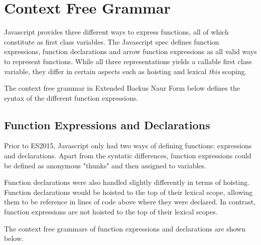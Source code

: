 \section{Context Free Grammar}

Javascript provides three different ways to express functions, all of which constitute as first class variables\parencite{firstClassFunctions}. The Javascript spec\parencite{jsCfg} defines function expressions, function declarations and arrow function expressions as all valid ways to represent functions. While all three representations yields a callable first class variable, they differ in certain aspects such as hoisting\parencite{hoisting} and lexical \textit{this} scoping\parencite{arrowFn}.

The context free grammar in Extended Backus Naur Form\parencite{ebnf} below defines the syntax of the different function expressions.

\subsection{Function Expressions and Declarations}
Prior to ES2015\parencite{es2015}, Javascript only had two ways of defining functions: expressions and declarations. Apart from the syntatic differences, function expressions could be defined as anonymous "thunks" and then assigned to variables. 

Function declarations were also handled slightly differently in terms of hoisting. Function declarations would be hoisted to the top of their lexical scope, allowing them to be reference in lines of code above where they were declared. In contrast, function expressions are not hoisted to the top of their lexical scopes.

The context free grammars of function expressions and declarations are shown below.

\begin{bnf*}
    { \bnfsp {} \bnfsp \bnfts{(}}\\
    \\
    { \bnfsp \bnfts{(}}\\
\end{bnf*}


